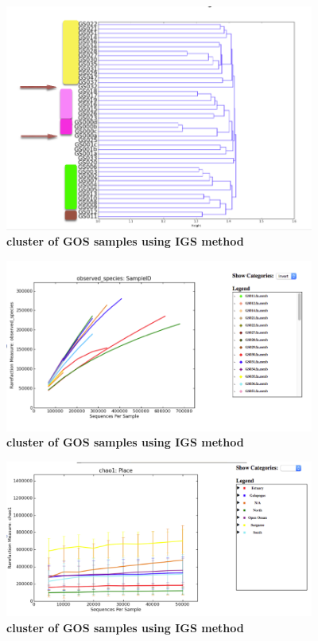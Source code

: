 \documentclass{article}
\begin{document}
\begin{figure}[!ht]
 \centerline{\includegraphics[width=4in]{./figures/GOS_cluster.png}}
\caption{\bf cluster of GOS samples using IGS method}
\label{fig:concept}
\end{figure}

\begin{figure}[!ht]
 \centerline{\includegraphics[width=4in]{./figures/GOS_observed.png}}
\caption{\bf cluster of GOS samples using IGS method}
\label{fig:concept}
\end{figure}

\begin{figure}[!ht]
 \centerline{\includegraphics[width=4in]{./figures/GOS_chao.png}}
\caption{\bf cluster of GOS samples using IGS method}
\label{fig:concept}
\end{figure}
\end{document}
